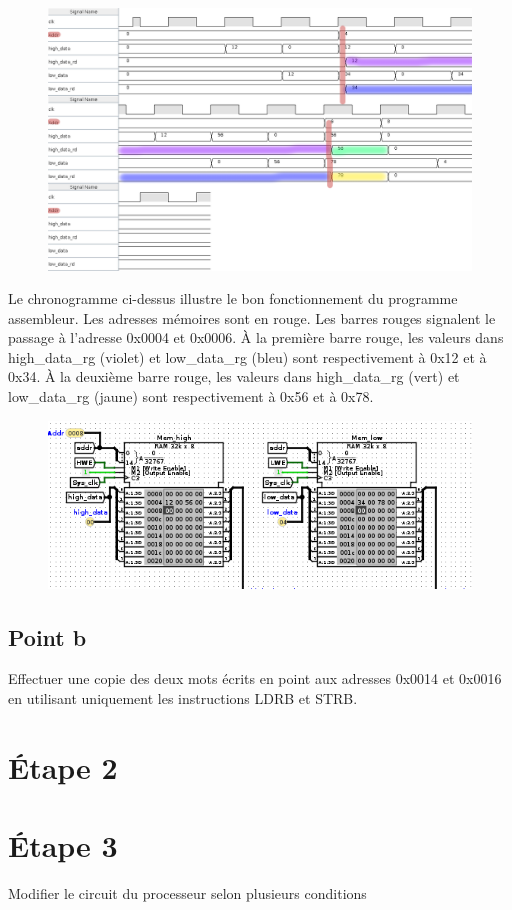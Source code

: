 \documentclass[a4paper]{article} %
\begin{document}
\begin{figure}[H]
    \centering
    \includegraphics[width=1\textwidth]{src/CHRONO_ET1.png}
 \label{chrono_et1}
\end{figure}
Le chronogramme ci-dessus illustre le bon fonctionnement du programme assembleur. Les adresses mémoires sont en rouge. Les barres rouges signalent le passage à l'adresse 0x0004 et 0x0006. À la première barre rouge, les valeurs dans high\_data\_rg (violet) et low\_data\_rg (bleu) sont respectivement à 0x12 et à 0x34. À la deuxième barre rouge, les valeurs dans high\_data\_rg (vert) et low\_data\_rg (jaune)  sont respectivement à 0x56 et à 0x78.
\begin{figure}[H]
    \centering
    \includegraphics[width=.8\textwidth]{src/MEM_EXMPL.png}
    \label{fig:mem_exmpl_pic}
\end{figure}

\subsection{Point b}
Effectuer une copie des deux mots écrits en point aux adresses 0x0014 et 0x0016 en utilisant uniquement les instructions LDRB et STRB.


\section{Étape 2}

\section{Étape 3}
Modifier le circuit du processeur selon plusieurs conditions
\end{document}
